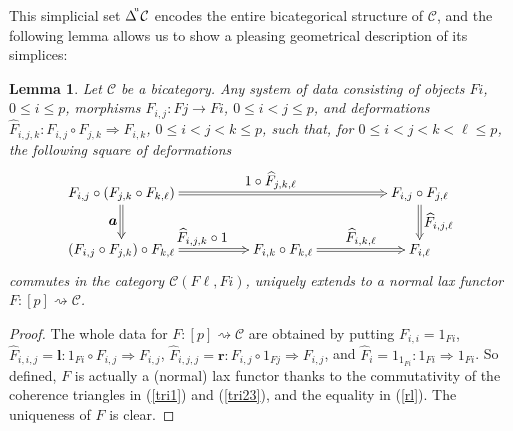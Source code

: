 \documentclass[]{amsart}
\newtheorem{lemma}[theorem]{Lemma}
\begin{document}
This simplicial set $\Delta^{\hspace{-2pt}^\mathrm{u}}{\ensuremath{\mathcal{C}}}$ encodes the entire bicategorical
structure of ${\ensuremath{\mathcal{C}}}$, and the following lemma allows us to show a pleasing geometrical description of
its simplices:

\begin{lemma}\label{gn.1} Let ${\ensuremath{\mathcal{C}}}$ be a bicategory. Any system of data consisting of objects $Fi$, $0\leq i\leq p$, morphisms  $F_{i,j}:Fj\to Fi$, $0\leq i<j\leq p$,  and deformations ${\widehat{F}_{i,j,k}:F_{i,j}\circ F_{j,k}\Rightarrow F_{i,k}}$, $0\leq i<j<k\leq p$, such that, for ${0\leq i<j<k<\ell\leq p}$, the  following square of deformations
$$\xymatrix@C=50pt{F_{i,j}\circ ( F_{j,k}\circ F_{k,\ell})\ar@{=>}[rr]^{\textstyle 1\circ \widehat{F}_{{j,k,\ell}}}
\ar@{=>}[d]_{\textstyle \boldsymbol{a}}&& F_{i,j}\circ F_{j,\ell} \ar@{=>}[d]^{\textstyle \widehat{F}_{{i,j,\ell}}} \\
(F_{i,j}\circ F_{j,k})\circ F_{k,\ell}\ar@{=>}[r]^{\textstyle\widehat{F}_{{i,j,k}}\circ 1}&
F_{i,k}\circ F_{k,\ell} \ar@{=>}[r]^-{\textstyle \widehat{F}_{{i,k,\ell}}}&F_{i,\ell}
 }
 $$
commutes in the category ${\ensuremath{\mathcal{C}}}(F\ell,Fi)$,  uniquely extends to a normal lax functor
${F:[p]\rightsquigarrow {\ensuremath{\mathcal{C}}}}$.
\end{lemma}
\begin{proof} The whole data for $F:[p]\rightsquigarrow {\ensuremath{\mathcal{C}}}$ are obtained by putting $F_{i,i}=1_{Fi}$, $\widehat{F}_{i,i,j}=\boldsymbol{l}:1_{Fi}\circ F_{i,j}\Rightarrow F_{i,j}$, ${\widehat{F}_{i,j,j}=\boldsymbol{r}:F_{i,j}\circ 1_{Fj}\Rightarrow F_{i,j}}$, and $\widehat{F}_i=1_{1_{Fi}}:1_{Fi}\Rightarrow 1_{Fi}$. So defined, $F$ is actually a (normal) lax functor thanks to the commutativity of the coherence triangles in (\ref{tri1}) and (\ref{tri23}), and the equality in (\ref{rl}). The uniqueness of $F$ is clear.
\end{proof}
\end{document}
